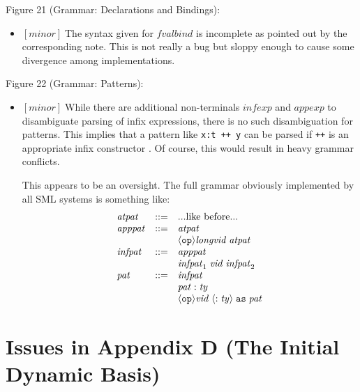 \documentclass{article}
\newcommand{\m}[1]{$[\mathit{#1}]\;$}
\newcommand{\minor}{\m{minor}}
\begin{document}
Figure 21 (Grammar: Declarations and Bindings):
\nopagebreak

\begin{itemize}
\item \minor The syntax given for $\mathit{fvalbind}$ is incomplete as pointed out by the corresponding note. This is not really a bug but sloppy enough to cause some divergence among implementations.
\end{itemize}


Figure 22 (Grammar: Patterns):
\nopagebreak

\begin{itemize}
\item \minor While there are additional non-terminals $\mathit{infexp}$ and $\mathit{appexp}$ to disambiguate parsing of infix expressions, there is no such disambiguation for patterns. This implies that a pattern like {\tt x:t ++ y} can be parsed if {\tt ++} is an appropriate infix constructor \cite{addenda}. Of course, this would result in heavy grammar conflicts.

This appears to be an oversight. The full grammar obviously implemented by all SML systems is something like:
\begin{displaymath}
\begin{array}{lcll}
\mathit{atpat} &::=& \mbox{...like before...} \\
\mathit{apppat} &::=& \mathit{atpat} \\
&& \langle{\tt{op}}\rangle \mathit{longvid} \; \mathit{atpat} \\
\mathit{infpat} &::=& \mathit{apppat} \\
&& \mathit{infpat}_1 \; \mathit{vid} \; \mathit{infpat}_2 \\
\mathit{pat} &::=& \mathit{infpat} \\
&& \mathit{pat} \; {\tt:} \; \mathit{ty} \\
&& \langle{\tt{op}}\rangle \mathit{vid} \; \langle{\tt:} \; \mathit{ty}\rangle
	\; {\tt as} \; \mathit{pat}
\end{array}
\end{displaymath}
\end{itemize}


\section{Issues in Appendix D (The Initial Dynamic Basis)}
\label{bugsappendixd}
\end{document}
